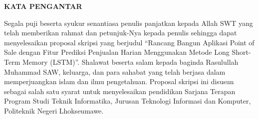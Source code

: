 \clearpage
{}
{}
\begin{center}
    \textbf{\large KATA PENGANTAR}\\[3em]
\end{center}

Segala puji beserta syukur senantiasa penulis panjatkan kepada Allah SWT yang telah memberikan rahmat dan petunjuk-Nya kepada penulis sehingga dapat menyelesaikan proposal skripsi yang berjudul “Rancang Bangun Aplikasi Point of Sale dengan Fitur Prediksi Penjualan Harian Menggunakan Metode Long Short-Term Memory (LSTM)”. Shalawat beserta salam kepada baginda Rasulullah Muhammad SAW, keluarga, dan para sahabat yang telah berjasa dalam memperjuangkan islam dan ilmu pengetahuan. Proposal skripsi ini disusun sebagai salah satu syarat untuk menyelesaikan pendidikan Sarjana Terapan Program Studi Teknik Informatika, Jurusan Teknologi Informasi dan Komputer, Politeknik Negeri Lhokseumawe. 

